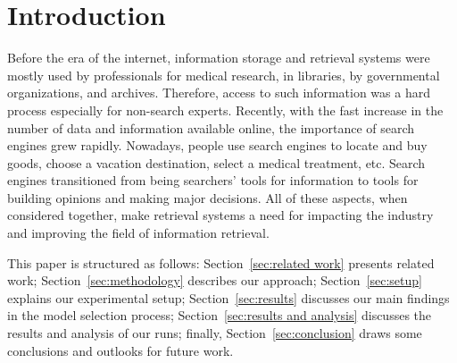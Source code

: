 \section{Introduction}
\label{sec:introduction}

Before the era of the internet, information storage and retrieval systems were mostly
used by professionals for medical research, in libraries, by governmental
organizations, and archives. Therefore, access to such information was a hard process especially
for non-search experts. Recently, with the fast increase in the number of data and information
available online, the importance of search engines grew rapidly. Nowadays, people use
search engines to locate and buy goods, choose a vacation destination, select
a medical treatment, etc. Search engines
transitioned from being searchers' tools for information to tools for building opinions and making
major decisions. All of these aspects, when considered together, make retrieval systems a need for impacting
the industry and improving the field of information retrieval.


This paper is structured as follows: Section~\ref{sec:related work} presents related work; Section~\ref{sec:methodology} describes our approach; Section~\ref{sec:setup} explains our experimental setup; Section~\ref{sec:results} discusses our main findings in the model selection process; Section~\ref{sec:results and analysis} discusses the results and analysis of our runs;  finally, Section~\ref{sec:conclusion} draws some conclusions and outlooks for future work.